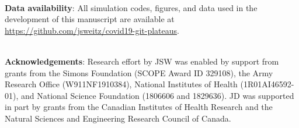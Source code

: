 \mbox{}\\
\noindent
\textbf{Data availability}:
All simulation codes, figures, and data used in the development of this manuscript are available at \url{https://github.com/jsweitz/covid19-git-plateaus}.

\mbox{}\\
\noindent
\textbf{Acknowledgements}:
Research effort by JSW was enabled
by support from grants from the Simons Foundation (SCOPE Award ID 329108), the Army Research 
Office (W911NF1910384), National Institutes of Health (1R01AI46592-01), 
and National Science Foundation (1806606 and 1829636). JD was supported in part by 
grants from the Canadian Institutes of Health Research and the Natural Sciences and Engineering Research Council of Canada.
